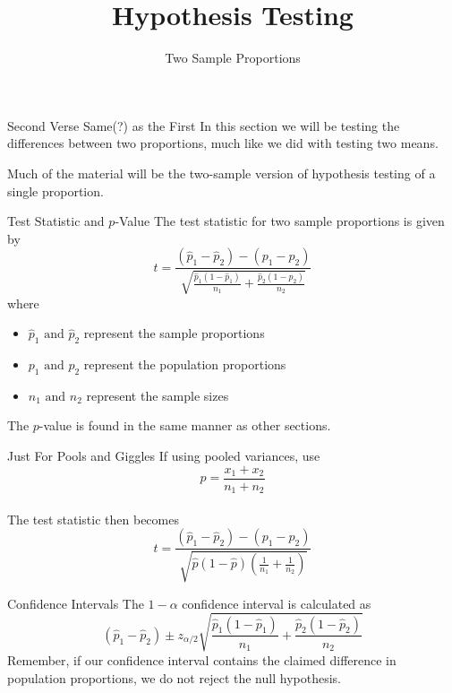 \documentclass[t]{beamer}
\title{Hypothesis Testing}
\subtitle{Two Sample Proportions}
\author{}
\date{}
\begin{document}

\begin{frame} 
\maketitle
\end{frame}

\begin{frame}{Second Verse Same(?) as the First}
In this section we will be testing the differences between two proportions, much like we did with testing two means. \newline\\	\pause

Much of the material will be the two-sample version of hypothesis testing of a single proportion.
\end{frame}

\begin{frame}{Test Statistic and $p$-Value}
The test statistic for two sample proportions is given by
\[
t = \frac{(\hat{p}_1-\hat{p}_2) - (p_1 - p_2)}{\sqrt{\frac{\hat{p}_1(1-\hat{p}_1)}{n_1}+\frac{\hat{p}_2(1-\hat{p}_2)}{n_2}}}
\]
where 	\pause
\begin{itemize}
	\item $\hat{p}_1 \text{ and } \hat{p}_2$ represent the sample proportions	\pause
	\item $p_1 \text{ and } p_2$ represent the population proportions	\pause
	\item $n_1 \text{ and } n_2$ represent the sample sizes	\pause
\end{itemize}

The $p$-value is found in the same manner as other sections.
\end{frame}

\begin{frame}{Just For Pools and Giggles}
If using pooled variances, use
\[
\hat{p} = \frac{x_1 + x_2}{n_1 + n_2}
\]
\pause	\newline\\
The test statistic then becomes
\[
t = \frac{(\hat{p}_1-\hat{p}_2) - (p_1 - p_2)}{\sqrt{\hat{p}(1-\hat{p})\left(\frac{1}{n_1} + \frac{1}{n_2}\right)}}
\]
\end{frame}

\begin{frame}{Confidence Intervals}
The $1-\alpha$ confidence interval is calculated as
\[
(\hat{p}_1 - \hat{p}_2) \pm z_{\alpha/2}\sqrt{\frac{\hat{p}_1(1-\hat{p}_1)}{n_1}+\frac{\hat{p}_2(1-\hat{p}_2)}{n_2}}
\]	\pause
Remember, if our confidence interval contains the claimed difference in population proportions, we do not reject the null hypothesis.
\end{frame}
\end{document}
